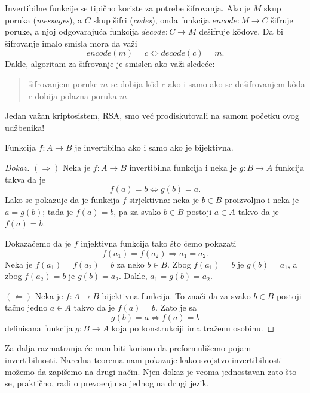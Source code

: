 \medskip

\begin{EX}
  Invertibilne funkcije se tipi\v cno koriste za potrebe \v sifrovanja. Ako je $M$ skup
  poruka (\emph{messages}), a $C$ skup \v sifri (\emph{codes}), onda funkcija
  $
    \mathit{encode} : M \to C
  $
  \v sifruje poruke, a njoj odgovaraju\'ca funkcija
  $
    \mathit{decode} : C \to M
  $
  de\v sifruje k\=odove. Da bi \v sifrovanje imalo smisla mora da va\v zi
  $$
    \mathit{encode}(m) = c \Leftrightarrow \mathit{decode}(c) = m.
  $$
  Dakle, algoritam za \v sifrovanje je smislen ako va\v zi slede\'ce:
  \begin{quote}
    \v sifrovanjem poruke $m$ se dobija k\^od $c$ ako i samo ako se de\v sifrovanjem k\^oda $c$ dobija
    polazna poruka $m$.
  \end{quote}
  Jedan va\v zan kriptosistem, RSA, smo ve\'c prodiskutovali na samom po\v cetku ovog ud\v zbenika!
\end{EX}

\begin{THM}
  Funkcija $f : A \to B$ je invertibilna ako i samo ako je bijektivna.
\end{THM}
\begin{proof}[Dokaz]
  $(\Rightarrow)$
  Neka je $f : A \to B$ invertibilna funkcija i neka je $g : B \to A$ funkcija takva da je
  $$
    f(a) = b \Leftrightarrow g(b) = a.
  $$
  Lako se pokazuje da je funkcija $f$ sirjektivna: neka je $b \in B$ proizvoljno i neka je $a = g(b)$; tada je
  $f(a) = b$, pa za svako $b \in B$ postoji $a \in A$ takvo da je $f(a) = b$.

  Dokaza\'cemo da je $f$ injektivna funkcija tako \v sto \'cemo pokazati
  $$
    f(a_1) = f(a_2) \Rightarrow a_1 = a_2.
  $$
  Neka je $f(a_1) = f(a_2) = b$ za neko $b \in B$. Zbog $f(a_1) = b$ je $g(b) = a_1$, a zbog
  $f(a_2) = b$ je $g(b) = a_2$. Dakle, $a_1 = g(b) = a_2$.

  $(\Leftarrow)$
  Neka je $f : A \to B$ bijektivna funkcija. To zna\v ci da za svako $b \in B$ postoji ta\v cno jedno
  $a \in A$ takvo da je $f(a) = b$. Zato je sa
  $$
    g(b) = a \Leftrightarrow f(a) = b
  $$
  definisana funkcija $g : B \to A$ koja po konstrukciji ima tra\v zenu osobinu.
\end{proof}

Za dalja razmatranja \'ce nam biti korisno da preformuli\v semo pojam invertibilnosti. Naredna teorema
nam pokazuje kako svojstvo invertibilnosti mo\v zemo da zapi\v semo na drugi na\v cin. Njen dokaz je veoma
jednostavan zato \v sto se, prakti\v cno, radi o prevo\dj enju sa jednog na drugi jezik.

